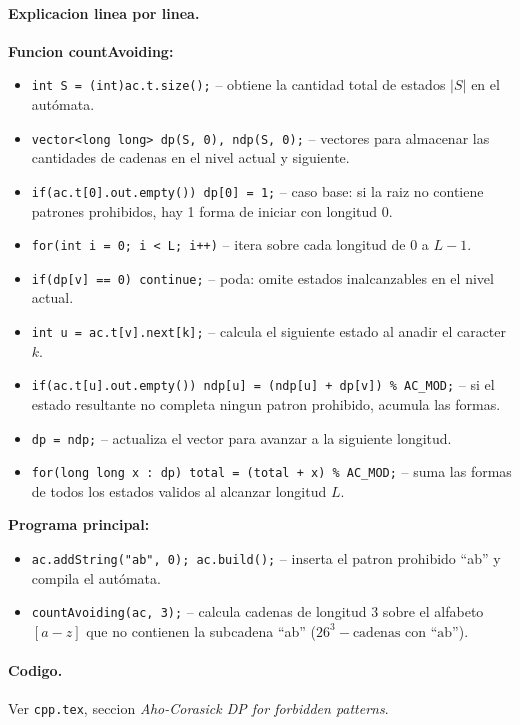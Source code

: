 \paragraph{Explicacion linea por linea.}
\textbf{Funcion countAvoiding:}
\begin{itemize}\setlength\itemsep{0pt}
	\item \verb|int S = (int)ac.t.size();| -- obtiene la cantidad total de estados $|S|$ en el autómata.
	\item \verb|vector<long long> dp(S, 0), ndp(S, 0);| -- vectores para almacenar las cantidades de cadenas en el nivel actual y siguiente.
	\item \verb|if(ac.t[0].out.empty()) dp[0] = 1;| -- caso base: si la raiz no contiene patrones prohibidos, hay 1 forma de iniciar con longitud 0.
	\item \verb|for(int i = 0; i < L; i++)| -- itera sobre cada longitud de 0 a $L-1$.
	\item \verb|if(dp[v] == 0) continue;| -- poda: omite estados inalcanzables en el nivel actual.
	\item \verb|int u = ac.t[v].next[k];| -- calcula el siguiente estado al anadir el caracter $k$.
	\item \verb|if(ac.t[u].out.empty()) ndp[u] = (ndp[u] + dp[v]) % AC_MOD;| -- si el estado resultante no completa ningun patron prohibido, acumula las formas.
	\item \verb|dp = ndp;| -- actualiza el vector para avanzar a la siguiente longitud.
	\item \verb|for(long long x : dp) total = (total + x) % AC_MOD;| -- suma las formas de todos los estados validos al alcanzar longitud $L$.
\end{itemize}
\textbf{Programa principal:}
\begin{itemize}\setlength\itemsep{0pt}
	\item \verb|ac.addString("ab", 0); ac.build();| -- inserta el patron prohibido ``ab'' y compila el autómata.
	\item \verb|countAvoiding(ac, 3);| -- calcula cadenas de longitud 3 sobre el alfabeto $[a-z]$ que no contienen la subcadena ``ab'' ($26^3 - \text{cadenas con ``ab''}$).
\end{itemize}

\paragraph{Codigo.}
Ver \texttt{cpp.tex}, seccion \textit{Aho-Corasick DP for forbidden patterns}.

\vspace{0.5em}
